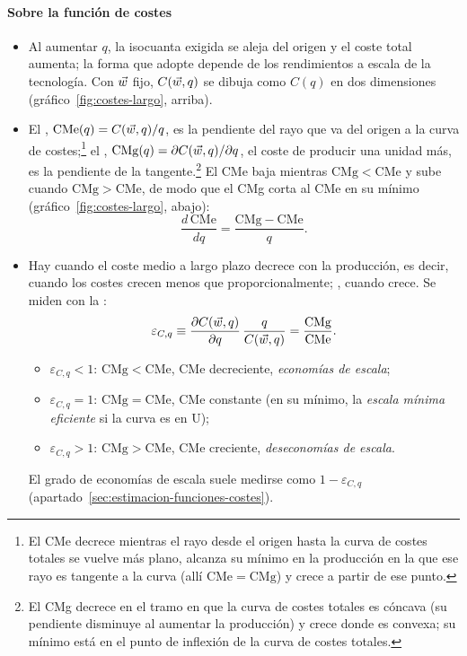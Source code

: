 \documentclass[11pt]{article}
\begin{document}
\paragraph{Sobre la función de costes}

\begin{itemize}
\item Al aumentar $q$, la isocuanta exigida se aleja del origen y el coste total aumenta; la forma que adopte depende de los rendimientos a escala de la tecnología. Con $\vec{w}$ fijo, $C(\vec{w},q)$ se dibuja como $C(q)$ en dos dimensiones (gráfico~\ref{fig:costes-largo}, arriba).
\item El , $\mathrm{CMe}(q)=C(\vec{w},q)/q$, es la pendiente del rayo que va del origen a la curva de costes;\footnote{El CMe decrece mientras el rayo desde el origen hasta la curva de costes totales se vuelve más plano, alcanza su mínimo en la producción en la que ese rayo es tangente a la curva (allí $\mathrm{CMe}=\mathrm{CMg}$) y crece a partir de ese punto.} el , $\mathrm{CMg}(q)=\partial C(\vec{w},q)/\partial q$, el coste de producir una unidad más, es la pendiente de la tangente.\footnote{El CMg decrece en el tramo en que la curva de costes totales es cóncava (su pendiente disminuye al aumentar la producción) y crece donde es convexa; su mínimo está en el punto de inflexión de la curva de costes totales.} El CMe baja mientras $\mathrm{CMg}<\mathrm{CMe}$ y sube cuando $\mathrm{CMg}>\mathrm{CMe}$, de modo que el CMg corta al CMe en su mínimo (gráfico~\ref{fig:costes-largo}, abajo):
  \begin{equation}
  \frac{d\,\mathrm{CMe}}{dq}=\frac{\mathrm{CMg}-\mathrm{CMe}}{q}. \label{eq:cme-cmg}
  \end{equation}
\item Hay  cuando el coste medio a largo plazo decrece con la producción, es decir, cuando los costes crecen menos que proporcionalmente; , cuando crece. Se miden con la :
  \begin{equation}
  \varepsilon_{C,q}\equiv\frac{\partial C(\vec{w},q)}{\partial q}\,\frac{q}{C(\vec{w},q)}=\frac{\mathrm{CMg}}{\mathrm{CMe}}. \label{eq:elasticidad-coste}
  \end{equation}
  \begin{itemize}
  \item $\varepsilon_{C,q}<1$: $\mathrm{CMg}<\mathrm{CMe}$, CMe decreciente, \emph{economías de escala};
  \item $\varepsilon_{C,q}=1$: $\mathrm{CMg}=\mathrm{CMe}$, CMe constante (en su mínimo, la \emph{escala mínima eficiente} si la curva es en U);
  \item $\varepsilon_{C,q}>1$: $\mathrm{CMg}>\mathrm{CMe}$, CMe creciente, \emph{deseconomías de escala}.
  \end{itemize}
  El grado de economías de escala suele medirse como $1-\varepsilon_{C,q}$ (apartado~\ref{sec:estimacion-funciones-costes}).
\end{itemize}
\end{document}
